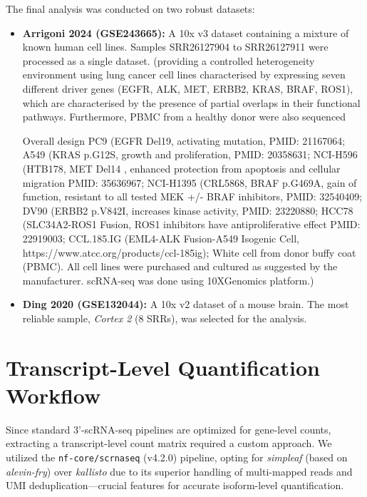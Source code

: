 The final analysis was conducted on two robust datasets:
\begin{itemize}
    \item \textbf{Arrigoni 2024 (GSE243665):} A 10x v3 dataset containing a mixture of known human cell lines. Samples SRR26127904 to SRR26127911 were processed as a single dataset. (providing a controlled heterogeneity environment using lung cancer cell lines characterised by expressing seven different driver genes (EGFR, ALK, MET, ERBB2, KRAS, BRAF, ROS1), which are characterised by the presence of partial overlaps in their functional pathways. Furthermore, PBMC from a healthy donor were also sequenced
 	
Overall design	PC9 (EGFR Del19, activating mutation, PMID: 21167064; A549 (KRAS p.G12S, growth and proliferation, PMID: 20358631; NCI-H596 (HTB178, MET Del14 , enhanced protection from apoptosis and cellular migration PMID: 35636967; NCI-H1395 (CRL5868, BRAF p.G469A, gain of function, resistant to all tested MEK +/- BRAF inhibitors, PMID: 32540409; DV90 (ERBB2 p.V842I, increases kinase activity, PMID: 23220880; HCC78 (SLC34A2-ROS1 Fusion, ROS1 inhibitors have antiproliferative effect PMID: 22919003; CCL.185.IG (EML4-ALK Fusion-A549 Isogenic Cell, https://www.atcc.org/products/ccl-185ig); White cell from donor buffy coat (PBMC). All cell lines were purchased and cultured as suggested by the manufacturer. scRNA-seq was done using 10XGenomics platform.)
    \item \textbf{Ding 2020 (GSE132044):} A 10x v2 dataset of a mouse brain. The most reliable sample, \textit{Cortex 2} (8 SRRs), was selected for the analysis.
\end{itemize}

\section{Transcript-Level Quantification Workflow}
Since standard 3'-scRNA-seq pipelines are optimized for gene-level counts, extracting a transcript-level count matrix required a custom approach. We utilized the \texttt{nf-core/scrnaseq} (v4.2.0) pipeline, opting for \textit{simpleaf} (based on \textit{alevin-fry}) over \textit{kallisto} due to its superior handling of multi-mapped reads and UMI deduplication—crucial features for accurate isoform-level quantification.

